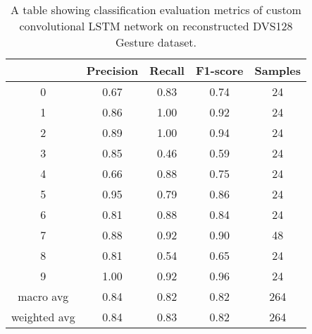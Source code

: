 \begin{table}[htb]
    \centering
    \begin{tabular}{|| c | c | c | c | c ||}
        \hline
            & Precision & Recall & F1-score & Samples \\
        \hline \hline
        0            & 0.67 & 0.83 & 0.74 & 24  \\
        \hline
        1            & 0.86 & 1.00 & 0.92 & 24  \\
        \hline
        2            & 0.89 & 1.00 & 0.94 & 24  \\
        \hline
        3            & 0.85 & 0.46 & 0.59 & 24  \\
        \hline
        4            & 0.66 & 0.88 & 0.75 & 24  \\
        \hline
        5            & 0.95 & 0.79 & 0.86 & 24  \\
        \hline
        6            & 0.81 & 0.88 & 0.84 & 24  \\
        \hline
        7            & 0.88 & 0.92 & 0.90 & 48  \\
        \hline
        8            & 0.81 & 0.54 & 0.65 & 24  \\
        \hline
        9            & 1.00 & 0.92 & 0.96 & 24  \\
        \hline
        macro avg    & 0.84 & 0.82 & 0.82 & 264 \\
        \hline
        weighted avg & 0.84 & 0.83 & 0.82 & 264 \\
        \hline
    \end{tabular}
    \caption{A table showing classification evaluation metrics of custom convolutional LSTM network on reconstructed DVS128 Gesture dataset.}
    \label{tab:custom_conv_lstm_dvs128_recon_evaluation_metrics}
\end{table}
